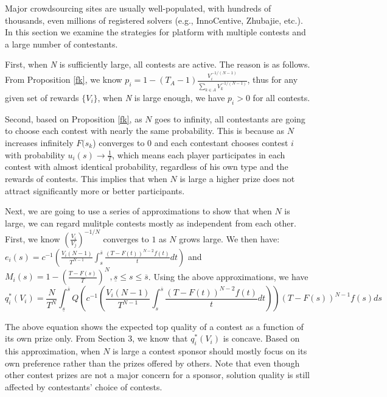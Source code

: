 \documentclass[12pt]{article}
\begin{document}
Major crowdsourcing sites are usually well-populated, with hundreds of thousands, even millions of registered solvers (e.g., InnoCentive, Zhubajie, etc.). In this section we examine the strategies for platform with multiple contests and a large number of contestants.

First, when \emph{N} is sufficiently large, all contests are active. The reason is as follows. From Proposition \ref{fk}, we know $p_{i}=1-(T_{A}-1)\frac{V_{i}^{-1/(N-1)}}{\sum_{k\in A}V_{k}^{-1/(N-1)}}$, thus for any given set of rewards $\{V_{i}\}$, when \emph{N} is
large enough, we have $p_{i}>0$ for all contests.

Second, based on Proposition \ref{fk}, as $N$ goes to infinity, all contestants are going to choose each contest
with nearly the same probability. This is because as  $N$
increases infinitely $F(s_{k}$) converges to 0 and each contestant chooses contest $i$
with probability $u_{i}(s)\rightarrow\frac{1}{T}$, which means each player participates in each contest
with almost identical probability, regardless of his own type and the rewards of contests. This implies that when $N$ is large a higher prize does not  attract significantly more or better participants.

Next, we are going to use a series of approximations to show that when $N$ is large, we can regard mulitple contests mostly as independent from each other. First, we know $(\frac{V_{i}}{V_{j}})^{-1/N}$ converges
to $1$ as $N$ grows large.  We then have: $e_{i}(s)=c^{-1}\left(\frac{V_{i}(N-1)}{T^{N-1}}\int_{s}^{\overline{s}}\frac{(T-F(t))^{N-2}f(t)}{t}dt\right)$
and $M_{i}(s)=1-(\frac{T-F(s)}{T})^{N},\underline{s}\leq s\leq\overline{s}$. Using the above approximations, we have
\[
q_{i}^*(V_{i})=\frac{N}{T^{N}}\int_{\underline{s}}^{\overline{s}}Q\left(c^{-1}\left(\frac{V_{i}(N-1)}{T^{N-1}}\int_{s}^{\overline{s}}\frac{(T-F(t))^{N-2}f(t)}{t}dt\right)\right)(T-F(s))^{N-1}f(s)ds \label{qstar}
\]

The above equation shows the expected top quality of a contest as a function of its own prize only. From Section 3, we know that $q_{i}^*(V_{i})$ is concave. Based on this approximation, when $N$ is large a contest sponsor should mostly focus on its own preference rather than the prizes offered by others.  Note that even though other contest prizes are not a major concern for a sponsor, solution quality is still affected by contestants' choice of contests.
\end{document}
